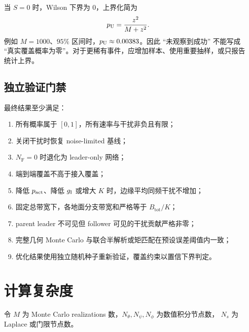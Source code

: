 \documentclass[UTF8,a4paper,11pt]{ctexart}
\newcommand{\NF}{N_{\mathrm F}}
\newcommand{\Btot}{B_{\mathrm{tot}}}
\begin{document}
当 $S=0$ 时，Wilson 下界为 $0$，上界化简为
\begin{equation}
 p_{\rm U}=\frac{z^2}{M+z^2}.
 \label{eq:zero-success-upper}
\end{equation}
例如 $M=1000$、$95\%$ 区间时，$p_{\rm U}\approx0.00383$。因此 ``未观察到成功''
不能写成 ``真实覆盖概率为零''。对于更稀有事件，应增加样本、使用重要抽样，或只报告
统计上界。

\subsection{独立验证门禁}

最终结果至少满足：
\begin{enumerate}[leftmargin=2em]
  \item 所有概率属于 $[0,1]$，所有速率与干扰非负且有限；
  \item 关闭干扰时恢复 noise-limited 基线；
  \item $\NF=0$ 时退化为 leader-only 网络；
  \item 端到端覆盖不高于接入覆盖；
  \item 降低 $p_{\rm act}$、降低 $g_{\rm I}$ 或增大 $K$ 时，边缘平均同频干扰不增加；
  \item 固定总带宽下，各地面分支带宽和严格等于 $\Btot/K$；
  \item parent leader 不可见但 follower 可见的干扰贡献严格非零；
  \item 完整几何 Monte Carlo 与联合半解析或矩匹配在预设误差阈值内一致；
  \item 优化结果使用独立随机种子重新验证，覆盖约束以置信下界判定。
\end{enumerate}

\section{计算复杂度}

令 $M$ 为 Monte Carlo realizations 数，$N_\theta,N_\psi,N_\phi$ 为数值积分节点数，
$N_s$ 为 Laplace 或门限节点数。
\end{document}
